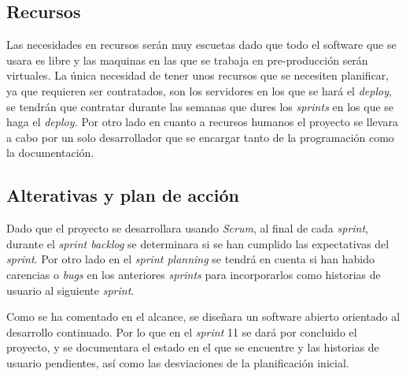 \subsection{Recursos}
Las necesidades en recursos serán muy escuetas dado que todo el software que se usara es libre y las maquinas en las que se trabaja en pre-producción serán virtuales. La única necesidad de tener unos recursos que se necesiten planificar, ya que requieren ser contratados, son los servidores en los que se hará el \textit{deploy}, se tendrán que contratar durante las semanas que dures los \textit{sprints} en los que se haga el \textit{deploy.} Por otro lado en cuanto a recursos humanos el proyecto se llevara a cabo por un solo desarrollador que se encargar tanto de la programación como la documentación.

\subsection{Alterativas y plan de acción}
Dado que el proyecto se desarrollara usando \textit{Scrum}, al final de cada \textit{sprint}, durante el \textit{sprint backlog} se determinara si se han cumplido las expectativas del \textit{sprint}. Por otro lado en el \textit{sprint planning} se tendrá en cuenta si han habido carencias o \textit{bugs} en los anteriores \textit{sprints} para incorporarlos como historias de usuario al siguiente \textit{sprint}. 

Como se ha comentado en el alcance, se diseñara un software abierto orientado al desarrollo continuado. Por lo que en el \textit{sprint} 11 se dará por concluido el proyecto, y se documentara el estado en el que se encuentre y las historias de usuario pendientes, así como las desviaciones de la planificación inicial. 
\newpage
